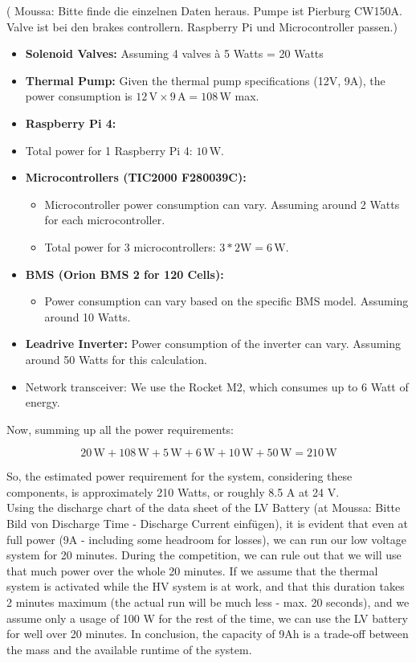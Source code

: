 ( Moussa: Bitte finde die einzelnen Daten heraus. Pumpe ist Pierburg CW150A. Valve ist bei den brakes controllern. Raspberry Pi und Microcontroller passen.)
\begin{itemize}
    \item \textbf{Solenoid Valves:} Assuming 4 valves à 5 Watts = 20 Watts
    \item \textbf{Thermal Pump:} Given the thermal pump specifications (12V, 9A), the power consumption is \(12 \, \text{V} \times 9 \, \text{A} = 108 \, \text{W}\) max.

    \item \textbf{Raspberry Pi 4:}
        \item Total power for 1 Raspberry Pi 4: \(10 \, \text{W}\).

    \item \textbf{Microcontrollers (TIC2000 F280039C):}
    \begin{itemize}
        \item Microcontroller power consumption can vary. Assuming around 2 Watts for each microcontroller.
        \item Total power for 3 microcontrollers: \(3 * 2  \text{W} = 6 \, \text{W}\).
    \end{itemize}

    \item \textbf{BMS (Orion BMS 2 for 120 Cells):}
    \begin{itemize}
        \item Power consumption can vary based on the specific BMS model. Assuming around 10 Watts.
    \end{itemize}

    \item \textbf{Leadrive Inverter:} Power consumption of the inverter can vary. Assuming around 50 Watts for this calculation.

    \item Network transceiver: We use the Rocket M2, which consumes up to 6 Watt of energy.
\end{itemize}

Now, summing up all the power requirements:

\[ 20 \, \text{W} + 108 \, \text{W} + 5 \, \text{W} + 6 \, \text{W} + 10 \, \text{W} + 50 \, \text{W} = 210 \, \text{W} \]

So, the estimated power requirement for the system, considering these components, is approximately 210 Watts, or roughly 8.5 A at 24 V. \\
Using the discharge chart of the data sheet of the LV Battery (at Moussa: Bitte Bild von Discharge Time - Discharge Current einfügen),
it is evident that even at full power (9A - including some headroom for losses), we can run our low voltage system for 20 minutes. During the competition, we can rule out that we will use that much power over the whole 20 minutes. If we assume that the thermal system
is activated while the HV system is at work, and that this duration takes 2 minutes maximum (the actual run will be much less - max. 20 seconds), and we assume only a usage of 100 W for the rest of the time,
we can use the LV battery for well over 20 minutes. 
In conclusion, the capacity of 9Ah is a trade-off between the mass and the available runtime of the system.
